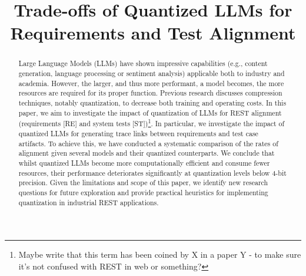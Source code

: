 \documentclass[conference]{IEEEtran}
\begin{document}
\title{Trade-offs of Quantized LLMs for Requirements and Test Alignment}

\author{
  \and
  \and
}

\maketitle

\begin{abstract}
Large Language Models (LLMs) have shown impressive capabilities (e.g., content
generation, language processing or sentiment analysis) applicable both to
industry and academia. However, the larger, and thus more performant, a model
becomes, the more resources are required for its proper function. Previous
research discusses compression techniques, notably quantization, to decrease
both training and operating costs. In this paper, we aim to investigate the
impact of quantization of LLMs for REST alignment (requirements [RE] and system
tests [ST])\footnote{Maybe write that this term has been coined by X in a paper Y - to make sure it's not confused with REST in web or something?}.
In particular, we investigate the impact of quantized LLMs for generating trace
links between requirements and test case artifacts. To achieve this, we have
conducted a systematic comparison of the rates of alignment given several models
and their quantized counterparts.
We conclude that whilst quantized LLMs become more computationally efficient and
consume fewer resources, their performance deteriorates significantly at
quantization levels below 4-bit precision. Given the limitations and scope of
this paper, we identify new research questions for future exploration and
provide practical heuristics for implementing quantization in industrial REST
applications.
\end{abstract}
\end{document}
